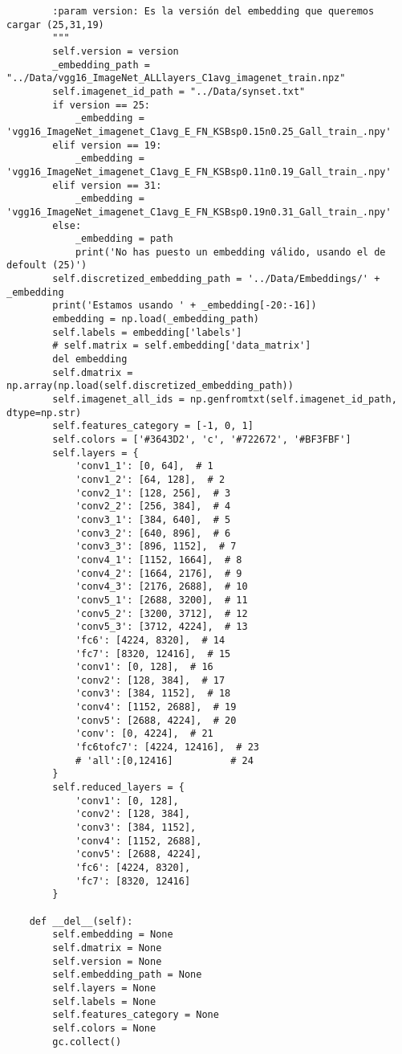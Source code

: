 \documentclass[12,twoside]{TFG-GM}
\theoremstyle{definition}
\theoremstyle{remark}
\begin{document}
\begin{verbatim}
        :param version: Es la versión del embedding que queremos cargar (25,31,19)
        """
        self.version = version
        _embedding_path = "../Data/vgg16_ImageNet_ALLlayers_C1avg_imagenet_train.npz"
        self.imagenet_id_path = "../Data/synset.txt"
        if version == 25:
            _embedding = 'vgg16_ImageNet_imagenet_C1avg_E_FN_KSBsp0.15n0.25_Gall_train_.npy'
        elif version == 19:
            _embedding = 'vgg16_ImageNet_imagenet_C1avg_E_FN_KSBsp0.11n0.19_Gall_train_.npy'
        elif version == 31:
            _embedding = 'vgg16_ImageNet_imagenet_C1avg_E_FN_KSBsp0.19n0.31_Gall_train_.npy'
        else:
            _embedding = path
            print('No has puesto un embedding válido, usando el de defoult (25)')
        self.discretized_embedding_path = '../Data/Embeddings/' + _embedding
        print('Estamos usando ' + _embedding[-20:-16])
        embedding = np.load(_embedding_path)
        self.labels = embedding['labels']
        # self.matrix = self.embedding['data_matrix']
        del embedding
        self.dmatrix = np.array(np.load(self.discretized_embedding_path))
        self.imagenet_all_ids = np.genfromtxt(self.imagenet_id_path, dtype=np.str)
        self.features_category = [-1, 0, 1]
        self.colors = ['#3643D2', 'c', '#722672', '#BF3FBF']
        self.layers = {
            'conv1_1': [0, 64],  # 1
            'conv1_2': [64, 128],  # 2
            'conv2_1': [128, 256],  # 3
            'conv2_2': [256, 384],  # 4
            'conv3_1': [384, 640],  # 5
            'conv3_2': [640, 896],  # 6
            'conv3_3': [896, 1152],  # 7
            'conv4_1': [1152, 1664],  # 8
            'conv4_2': [1664, 2176],  # 9
            'conv4_3': [2176, 2688],  # 10
            'conv5_1': [2688, 3200],  # 11
            'conv5_2': [3200, 3712],  # 12
            'conv5_3': [3712, 4224],  # 13
            'fc6': [4224, 8320],  # 14
            'fc7': [8320, 12416],  # 15
            'conv1': [0, 128],  # 16
            'conv2': [128, 384],  # 17
            'conv3': [384, 1152],  # 18
            'conv4': [1152, 2688],  # 19
            'conv5': [2688, 4224],  # 20
            'conv': [0, 4224],  # 21
            'fc6tofc7': [4224, 12416],  # 23
            # 'all':[0,12416]          # 24
        }
        self.reduced_layers = {
            'conv1': [0, 128],
            'conv2': [128, 384],
            'conv3': [384, 1152],
            'conv4': [1152, 2688],
            'conv5': [2688, 4224],
            'fc6': [4224, 8320],
            'fc7': [8320, 12416]
        }

    def __del__(self):
        self.embedding = None
        self.dmatrix = None
        self.version = None
        self.embedding_path = None
        self.layers = None
        self.labels = None
        self.features_category = None
        self.colors = None
        gc.collect()
	

\end{verbatim}
\end{document}

